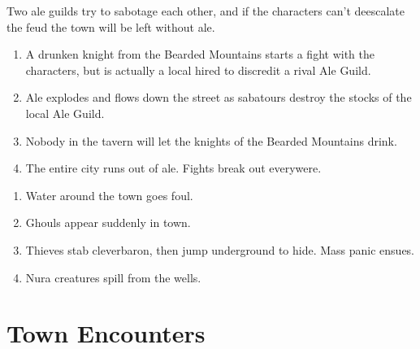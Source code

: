 \begin{multicols}{2}
Two ale guilds try to sabotage each other, and if the characters can't deescalate the feud the town will be left without ale.

\begin{enumerate}

	\item{A drunken knight from the Bearded Mountains starts a fight with the characters, but is actually a local hired to discredit a rival Ale Guild.}
	\item{Ale explodes and flows down the street as sabatours destroy the stocks of the local Ale Guild.}
	\item{Nobody in the tavern will let the knights of the Bearded Mountains drink.}
	\item{ The entire city runs out of ale.  Fights break out everywere.}

\end{enumerate}


\begin{enumerate}

	\item{ Water around the town goes foul.}
	\item{ Ghouls appear suddenly in town.}
	\item{ Thieves stab \gls{cleverbaron}, then jump underground to hide.  Mass panic ensues.}
	\item{  Nura creatures spill from the wells.}

\end{enumerate}

\humanthief

\end{multicols}

\section{Town Encounters}
\setcounter{encnum}{1}

